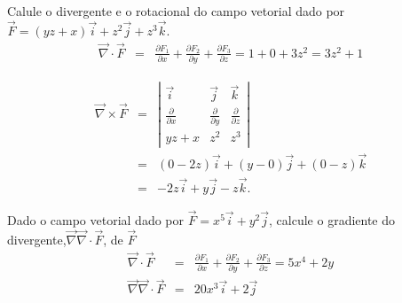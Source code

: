 \begin{ex} Calule o divergente e o rotacional do campo vetorial dado por $\vec{F}=(yz+x)\vec{i}+z^2\vec{j}+z^3\vec{k}$.
\begin{eqnarray}
 \vec{\nabla}\cdot \vec{F} &=& \frac{\partial F_1}{\partial x}+\frac{\partial F_2}{\partial y}+\frac{\partial F_3}{\partial z} =
 1+0+3z^2=3z^2+1
\end{eqnarray}

\begin{eqnarray}
  \vec{\nabla}\times \vec{F}&=&\left|
 \begin{array}{ccc}
 \vec{i} & \vec{j} & \vec{k} \\
 \frac{\partial}{\partial x} &\frac{\partial}{\partial y} &\frac{\partial}{\partial z} \\
yz+x & z^2 & z^3
 \end{array}
\right|\\&=&\left(0-2z\right)\vec{i}+\left(y-0\right)\vec{j}+\left(0-z\right)\vec{k}\\
&=&-2z\vec{i}+y\vec{j}-z\vec{k}.
\end{eqnarray}
\end{ex}

\begin{ex} Dado o campo vetorial dado por $\vec{F}=x^5\vec{i}+y^2\vec{j}$, calcule o gradiente do divergente,$ \vec{\nabla} \vec{\nabla}\cdot \vec{F}$, de $\vec{F}$
\begin{eqnarray}
 \vec{\nabla}\cdot \vec{F} &=& \frac{\partial F_1}{\partial x}+\frac{\partial F_2}{\partial y}+\frac{\partial F_3}{\partial z} =
 5x^4+2y\\
 \vec{\nabla} \vec{\nabla}\cdot \vec{F}&=&20x^3\vec{i}+2\vec{j}
\end{eqnarray}
 \end{ex}


